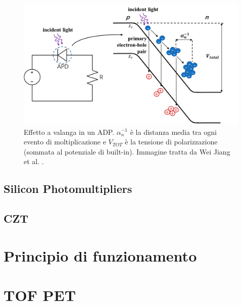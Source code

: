 \begin{figure}[tbh]
	\centering
	\includegraphics[width=0.8\linewidth]{./ImageFiles/ADP.jpg}
	\caption{Effetto a valanga in un ADP. $\alpha_n^{-1}$ è la distanza media tra ogni evento di moltiplicazione e $V_{TOT}$ è la tensione di polarizzazione (sommata al potenziale di built-in). Immagine tratta da Wei Jiang et al. \cite{Jiang2019}.} 
	\label{fig:adp}
\end{figure}


\subsection{Silicon Photomultipliers}

\subsection{CZT}


\section{Principio di funzionamento}

\section{TOF PET}